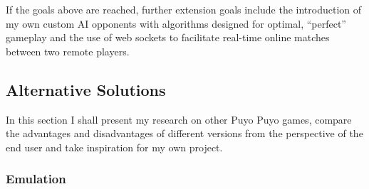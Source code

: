 \documentclass{article}
\begin{document}
If the goals above are reached, further extension goals include the introduction of my own custom AI opponents with algorithms designed for optimal, “perfect” gameplay and the use of web sockets to facilitate real-time online matches between two remote players.

\subsection{Alternative Solutions}

In this section I shall present my research on other Puyo Puyo games, compare the advantages and disadvantages of different versions from the perspective of the end user and take inspiration for my own project.

\subsubsection{Emulation}
\end{document}
